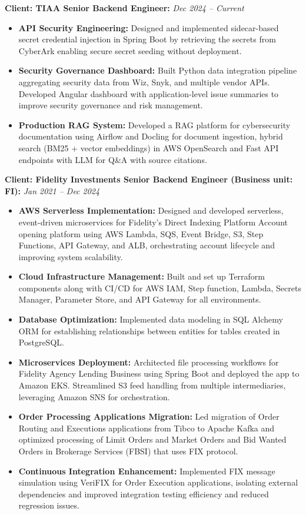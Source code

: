 \documentclass[11pt,a4paper]{article}
\newcommand{\resumeItem}[1]{\item[]\small{#1}}
\newcommand{\resumeItemList}[1]{\begin{itemize}[leftmargin=0.5in, itemsep=0.1em, parsep=0pt, partopsep=0pt, topsep=0.15em, label={}, labelsep=0pt]
    \small
    #1
\end{itemize}}
\begin{document}
\textbf{Client: TIAA Senior Backend Engineer:} \hfill \textit{Dec 2024 -- Current}
\resumeItemList{
    \resumeItem{\textbf{API Security Engineering:} Designed and implemented sidecar-based secret credential injection in Spring Boot by retrieving the secrets from CyberArk enabling secure secret seeding without deployment.}
    \resumeItem{\textbf{Security Governance Dashboard:} Built Python data integration pipeline aggregating security data from Wiz, Snyk, and multiple vendor APIs. Developed Angular dashboard with application-level issue summaries to improve security governance and risk management.}
    \resumeItem{\textbf{Production RAG System:} Developed a RAG platform for cybersecurity documentation using Airflow and Docling for document ingestion, hybrid search (BM25 + vector embeddings) in AWS OpenSearch and Fast API endpoints with LLM for Q\&A with source citations.}
}

\vspace{0.2em}
\textbf{Client: Fidelity Investments Senior Backend Engineer (Business unit: FI):} \hfill \textit{Jan 2021 -- Dec 2024}
\resumeItemList{
    \resumeItem{\textbf{AWS Serverless Implementation:} Designed and developed serverless, event-driven microservices for Fidelity's Direct Indexing Platform Account opening platform using AWS Lambda, SQS, Event Bridge, S3, Step Functions, API Gateway, and ALB, orchestrating account lifecycle and improving system scalability.}
    \resumeItem{\textbf{Cloud Infrastructure Management:} Built and set up Terraform components along with CI/CD for AWS IAM, Step function, Lambda, Secrets Manager, Parameter Store, and API Gateway for all environments.}
    \resumeItem{\textbf{Database Optimization:} Implemented data modeling in SQL Alchemy ORM for establishing relationships between entities for tables created in PostgreSQL.}
    \resumeItem{\textbf{Microservices Deployment:} Architected file processing workflows for Fidelity Agency Lending Business using Spring Boot and deployed the app to Amazon EKS. Streamlined S3 feed handling from multiple intermediaries, leveraging Amazon SNS for orchestration.}
    \resumeItem{\textbf{Order Processing Applications Migration:} Led migration of Order Routing and Executions applications from Tibco to Apache Kafka and optimized processing of Limit Orders and Market Orders and Bid Wanted Orders in Brokerage Services (FBSI) that uses FIX protocol.}
    \resumeItem{\textbf{Continuous Integration Enhancement:} Implemented FIX message simulation using VeriFIX for Order Execution applications, isolating external dependencies and improved integration testing efficiency and reduced regression issues.}
}
\end{document}

